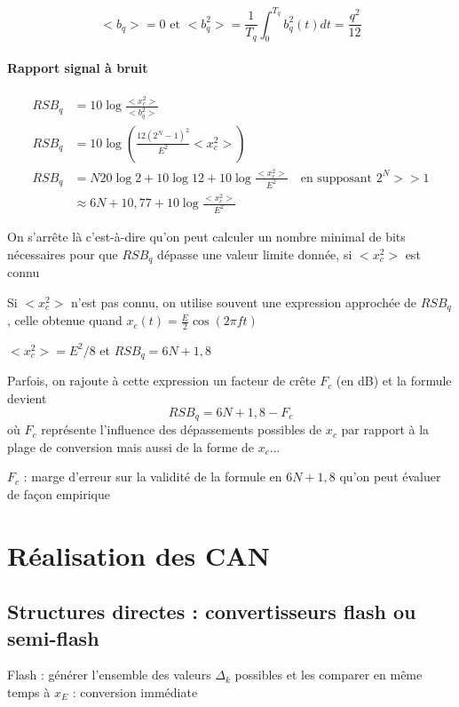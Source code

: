 \documentclass[main.tex]{subfiles}
\begin{document}

\[<b_q>=0 \text{ et } <b_q^2>=\frac{1}{T_q} \int_0^{T_q} b_q^2(t) dt = \frac{q^2}{12}\]

\paragraph{Rapport signal à bruit}
\begin{align*}
RSB_q & = 10 \log \frac{<x_c^2>}{<b_q^2>} \\
RSB_q & = 10 \log( \frac{12(2^N-1)^2}{E^2}<x_c^2>) \\
RSB_q & = N 20 \log 2 + 10 \log 12 + 10 \log \frac{<x_c^2>}{E^2} \quad \text{en supposant } 2^N >>1\\
& \approx 6N + 10,77 + 10 \log \frac{<x_c^2>}{E^2}
\end{align*}

On s'arrête là c'est-à-dire qu'on peut calculer un nombre minimal de bits nécessaires pour que $RSB_q$ dépasse une valeur limite donnée, si $<x_c^2>$ est connu

Si $<x_c^2>$ n'est pas connu, on utilise souvent une expression approchée de $RSB_q$, celle obtenue quand $x_c(t) = \frac{E}{2} \cos(2\pi f t)$

$<x_c^2> = E^2/8$ et $RSB_q = 6N+1,8$

\begin{rem}
Parfois, on rajoute à cette expression un facteur de crête $F_c$ (en dB) et la formule devient \[RSB_q=6N+1,8-F_c\]
où $F_c$ représente l'influence des dépassements possibles de $x_c$ par rapport à la plage de conversion mais aussi de la forme de $x_c$...

$F_c$ : marge d'erreur sur la validité de la formule en $6N+1,8$ qu'on peut évaluer de façon empirique
\end{rem}


\section{Réalisation des CAN}

\subsection{Structures directes : convertisseurs flash ou semi-flash}

Flash : générer l'ensemble des valeurs $\Delta_k$ possibles et les comparer en même temps à $x_E$ : conversion immédiate

\begin{exemple}[Flash pour n=7]
\end{exemple}
\end{document}
